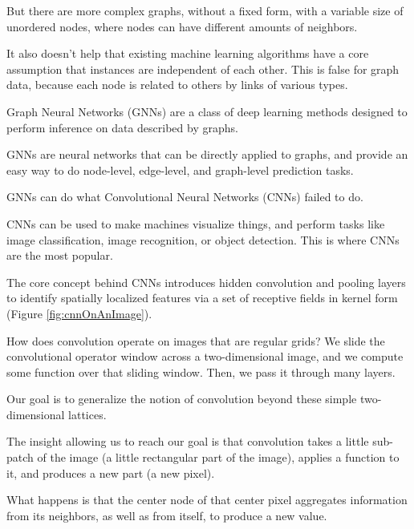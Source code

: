 But there are more complex graphs, without a fixed form, with a variable size of unordered nodes, where nodes can have different amounts of neighbors. \newline

It also doesn’t help that existing machine learning algorithms have a core assumption that instances are independent of each other. This is false for graph data, because each node is related to others by links of various types. \newline

Graph Neural Networks (GNNs) are a class of deep learning methods designed to perform inference on data described by graphs. \newline

GNNs are neural networks that can be directly applied to graphs, and provide an easy way to do node-level, edge-level, and graph-level prediction tasks.\newline

GNNs can do what Convolutional Neural Networks (CNNs) failed to do. \newline

CNNs can be used to make machines visualize things, and perform tasks like image classification, image recognition, or object detection. This is where CNNs are the most popular. \newline

The core concept behind CNNs introduces hidden convolution and pooling layers to identify spatially localized features via a set of receptive fields in kernel form (Figure \ref{fig:cnnOnAnImage}). \newline

How does convolution operate on images that are regular grids? We slide the convolutional operator window across a two-dimensional image, and we compute some function over that sliding window. Then, we pass it through many layers. \newline

Our goal is to generalize the notion of convolution beyond these simple two-dimensional lattices. \newline

The insight allowing us to reach our goal is that convolution takes a little sub-patch of the image (a little rectangular part of the image), applies a function to it, and produces a new part (a new pixel). \newline

What happens is that the center node of that center pixel aggregates information from its neighbors, as well as from itself, to produce a new value. \newline

